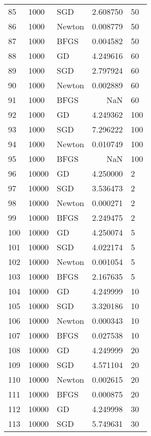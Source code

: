\begin{tabular}{lllrl}
85  &     1000 &     SGD &    2.608750 &     50 \\
86  &     1000 &  Newton &    0.008779 &     50 \\
87  &     1000 &    BFGS &    0.004582 &     50 \\
88  &     1000 &      GD &    4.249616 &     60 \\
89  &     1000 &     SGD &    2.797924 &     60 \\
90  &     1000 &  Newton &    0.002889 &     60 \\
91  &     1000 &    BFGS &         NaN &     60 \\
92  &     1000 &      GD &    4.249362 &    100 \\
93  &     1000 &     SGD &    7.296222 &    100 \\
94  &     1000 &  Newton &    0.010749 &    100 \\
95  &     1000 &    BFGS &         NaN &    100 \\
96  &    10000 &      GD &    4.250000 &      2 \\
97  &    10000 &     SGD &    3.536473 &      2 \\
98  &    10000 &  Newton &    0.000271 &      2 \\
99  &    10000 &    BFGS &    2.249475 &      2 \\
100 &    10000 &      GD &    4.250074 &      5 \\
101 &    10000 &     SGD &    4.022174 &      5 \\
102 &    10000 &  Newton &    0.001054 &      5 \\
103 &    10000 &    BFGS &    2.167635 &      5 \\
104 &    10000 &      GD &    4.249999 &     10 \\
105 &    10000 &     SGD &    3.320186 &     10 \\
106 &    10000 &  Newton &    0.000343 &     10 \\
107 &    10000 &    BFGS &    0.027538 &     10 \\
108 &    10000 &      GD &    4.249999 &     20 \\
109 &    10000 &     SGD &    4.571104 &     20 \\
110 &    10000 &  Newton &    0.002615 &     20 \\
111 &    10000 &    BFGS &    0.000875 &     20 \\
112 &    10000 &      GD &    4.249998 &     30 \\
113 &    10000 &     SGD &    5.749631 &     30 \\

\end{tabular}
